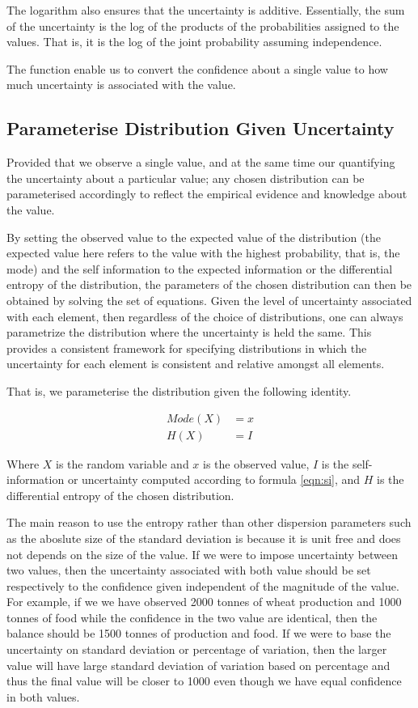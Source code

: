 \documentclass[nojss]{jss}\usepackage[]{graphicx}\usepackage[]{color}
\begin{document}
The logarithm also ensures that the uncertainty is
additive. Essentially, the sum of the uncertainty is the log of the
products of the probabilities assigned to the values. That is, it is
the log of the joint probability assuming independence.

The function enable us to convert the confidence about a single value
to how much uncertainty is associated with the value.




\subsection{Parameterise Distribution Given Uncertainty}


Provided that we observe a single value, and at the same time our
quantifying the uncertainty about a particular value; any chosen
distribution can be parameterised accordingly to reflect the empirical
evidence and knowledge about the value.

By setting the observed value to the expected value of the
distribution (the expected value here refers to the value with the
highest probability, that is, the mode) and the self information to
the expected information or the differential entropy of the
distribution, the parameters of the chosen distribution can then be
obtained by solving the set of equations. Given the level of
uncertainty associated with each element, then regardless of the
choice of distributions, one can always parametrize the distribution
where the uncertainty is held the same. This provides a consistent
framework for specifying distributions in which the uncertainty for
each element is consistent and relative amongst all elements.

That is, we parameterise the distribution given the following identity.

\begin{align}
  Mode(X) &= x\\ \nonumber
  H(X) &= I
\end{align}

Where $X$ is the random variable and $x$ is the observed value, $I$ is
the self-information or uncertainty computed according to formula
\ref{eqn:si}, and $H$ is the differential entropy of the chosen
distribution.

The main reason to use the entropy rather than other dispersion
parameters such as the aboslute size of the standard deviation is
because it is unit free and does not depends on the size of the
value. If we were to impose uncertainty between two values, then the
uncertainty associated with both value should be set respectively to
the confidence given independent of the magnitude of the value. For
example, if we we have observed 2000 tonnes of wheat production and
1000 tonnes of food while the confidence in the two value are
identical, then the balance should be 1500 tonnes of production and
food. If we were to base the uncertainty on standard deviation or
percentage of variation, then the larger value will have large
standard deviation of variation based on percentage and thus the final
value will be closer to 1000 even though we have equal confidence in
both values.
\end{document}
